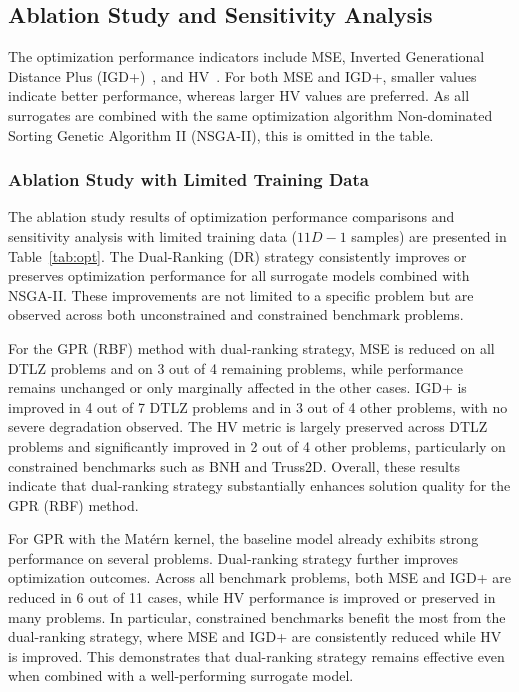 \documentclass{article}
\begin{document}
\subsection{Ablation Study and Sensitivity Analysis}
The optimization performance indicators include MSE, Inverted Generational Distance Plus (IGD+)~\cite{igd_plus}, and HV~\cite{hypervolume}. For both MSE and IGD+, smaller values indicate better performance, whereas larger HV values are preferred. As all surrogates are combined with the same optimization algorithm Non-dominated Sorting Genetic Algorithm II (NSGA-II), this is omitted in the table.

\subsubsection{Ablation Study with Limited Training Data}
The ablation study results of optimization performance comparisons and sensitivity analysis with limited training data ($11D-1$ samples) are presented in Table~\ref{tab:opt}. The Dual-Ranking (DR) strategy consistently improves or preserves optimization performance for all surrogate models combined with NSGA-II. These improvements are not limited to a specific problem but are observed across both unconstrained and constrained benchmark problems.

For the GPR (RBF) method with dual-ranking strategy, MSE is reduced on all DTLZ problems and on 3 out of 4 remaining problems, while performance remains unchanged or only marginally affected in the other cases. IGD+ is improved in 4 out of 7 DTLZ problems and in 3 out of 4 other problems, with no severe degradation observed. The HV metric is largely preserved across DTLZ problems and significantly improved in 2 out of 4 other problems, particularly on constrained benchmarks such as BNH and Truss2D. Overall, these results indicate that dual-ranking strategy substantially enhances solution quality for the GPR (RBF) method.

For GPR with the Matérn kernel, the baseline model already exhibits strong performance on several problems. Dual-ranking strategy further improves optimization outcomes. Across all benchmark problems, both MSE and IGD+ are reduced in 6 out of 11 cases, while HV performance is improved or preserved in many problems. In particular, constrained benchmarks benefit the most from the dual-ranking strategy, where MSE and IGD+ are consistently reduced while HV is improved. This demonstrates that dual-ranking strategy remains effective even when combined with a well-performing surrogate model.
\end{document}
